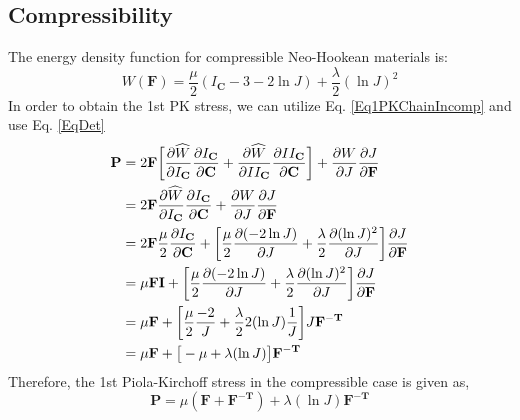 \documentclass[12pt,3p]{article}
\begin{document}
\subsection{Compressibility}
\vspace{-1ex}
The energy density function for compressible Neo-Hookean materials is: 
\begin{equation}\label{EqStrainEnergyComp}
W (\mathbf{F})= \frac{\mu}{2} (I_\mathbf{C} - 3 - 2 \ln J) + \frac{\lambda}{2} (\ln J)^2
\end{equation}
In order to obtain the 1st PK stress, we can utilize Eq. \ref{Eq1PKChainIncomp} and use Eq. \ref{EqDet}
\begin{align*}
\mathbf{P}
	&=  2 \mathbf{F} \bigg[ \pdv{\widehat{W}}{I_\mathbf{C}} \pdv{I_\mathbf{C}}{\mathbf{C}} 
	+ \pdv{\widehat{W}}{II_\mathbf{C}} \pdv{II_\mathbf{C}}{\mathbf{C}} \bigg]
	+ \pdv{W}{J} \pdv{J}{\mathbf{F}} \\
	&=2 \mathbf{F}  \pdv{\widehat{W}}{I_\mathbf{C}} \pdv{I_\mathbf{C}}{\mathbf{C}} + \pdv{W}{J} \pdv{J}{\mathbf{F}} \\
	&= 2 \mathbf{F} \frac{\mu}{2} \pdv{I_\mathbf{C}}{\mathbf{C}} 
	+ \bigg[ \frac{\mu}{2} \pdv{(-2 \ln J)}{J} + \frac{\lambda}{2} \pdv{(\ln J)^2}{J} \bigg] \pdv{J}{\mathbf{F}} \\
	&= \mu \mathbf{F} \mathbf{I}
	+ \bigg[ \frac{\mu}{2} \pdv{(-2 \ln J)}{J} + \frac{\lambda}{2} \pdv{(\ln J)^2}{J} \bigg] \pdv{J}{\mathbf{F}} \\
	&= \mu \mathbf{F} + \bigg[ \frac{\mu}{2} \frac{-2}{J} + \frac{\lambda}{2} 2 (\ln J) \frac{1}{J} \bigg] J \mathbf{F^{-T}} \\
	&= \mu \mathbf{F} + \big[ -\mu + \lambda (\ln J) \big] \mathbf{F^{-T}} 
\end{align*}
Therefore, the 1st Piola-Kirchoff stress in the compressible case is given as, 
\begin{equation}\label{EqCompPK}
\mathbf{P} = \mu (\mathbf{F} + \mathbf{F^{-T}}) + \lambda (\ln J) \mathbf{F^{-T}}
\end{equation}


\end{document}
